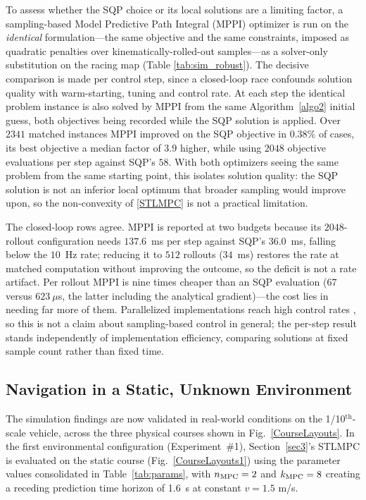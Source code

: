 \documentclass[journal]{IEEEtran}
\begin{document}
To assess whether the SQP choice or its local solutions are a limiting factor, a sampling-based Model Predictive Path Integral (MPPI) optimizer is run on the \emph{identical} formulation---the same objective and the same constraints, imposed as quadratic penalties over kinematically-rolled-out samples---as a solver-only substitution on the racing map (Table \ref{tab:sim_robust}). The decisive comparison is made per control step, since a closed-loop race confounds solution quality with warm-starting, tuning and control rate. At each step the identical problem instance is also solved by MPPI from the same Algorithm~\ref{algo2} initial guess, both objectives being recorded while the SQP solution is applied. Over $2341$ matched instances MPPI improved on the SQP objective in $0.38\%$ of cases, its best objective a median factor of $3.9$ higher, while using $2048$ objective evaluations per step against SQP's $58$. With both optimizers seeing the same problem from the same starting point, this isolates solution quality: the SQP solution is not an inferior local optimum that broader sampling would improve upon, so the non-convexity of \eqref{STLMPC} is not a practical limitation.

The closed-loop rows agree. MPPI is reported at two budgets because its $2048$-rollout configuration needs $137.6$~ms per step against SQP's $36.0$~ms, falling below the $10$~Hz rate; reducing it to $512$ rollouts ($34$~ms) restores the rate at matched computation without improving the outcome, so the deficit is not a rate artifact. Per rollout MPPI is nine times cheaper than an SQP evaluation ($67$ versus $623~\mu$s, the latter including the analytical gradient)---the cost lies in needing far more of them. Parallelized implementations reach high control rates \cite{Williams2016}, so this is not a claim about sampling-based control in general; the per-step result stands independently of implementation efficiency, comparing solutions at fixed sample count rather than fixed time.


\subsection{Navigation in a Static, Unknown Environment}\label{sec:exp1}
The simulation findings are now validated in real-world conditions on the 1/10$^{\text{th}}$-scale vehicle, across the three physical courses shown in Fig.~\ref{CourseLayouts}. In the first environmental configuration (Experiment~\#1), Section~\ref{sec3}'s STLMPC is evaluated on the static course (Fig.~\ref{CourseLayouts1}) using the parameter values consolidated in Table~\ref{tab:params}, with $n_\textup{MPC}=2$ and $k_\textup{MPC}=8$ creating a receding prediction time horizon of 1.6~s at constant $v=1.5$ m/s.
\end{document}
